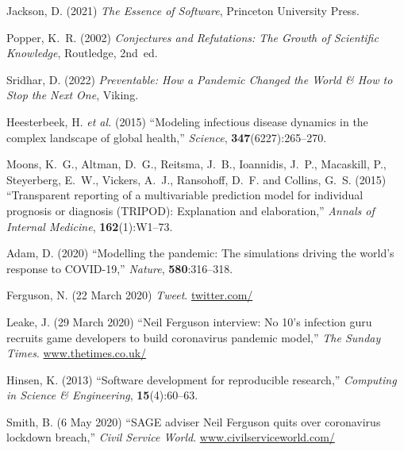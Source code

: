 \documentclass{comjnl}
\begin{document}
{\begin{thebibliography}{100}
{
Jackson, D. (2021) {\em The Essence of Software}, Princeton University Press.

Popper, K.~R. (2002) {\em Conjectures and Refutations: {The} Growth of
  Scientific Knowledge}, Routledge, 2nd~ed.

Sridhar, D. (2022) {\em Preventable: {How} a Pandemic Changed the World {\&}
  How to Stop the Next One}, Viking.

Heesterbeek, H. \emph{et al.} (2015) ``Modeling infectious disease dynamics in
  the complex landscape of global health,'' {\em Science},
  \textbf{347}(6227):265--270.
\newblock {}

Moons, K.~G., Altman, D.~G., Reitsma, J.~B., Ioannidis, J.~P., Macaskill, P.,
  Steyerberg, E.~W., Vickers, A.~J., Ransohoff, D.~F. and Collins, G.~S. (2015)
  ``Transparent reporting of a multivariable prediction model for individual
  prognosis or diagnosis ({TRIPOD}): {Explanation} and elaboration,'' {\em
  Annals of Internal Medicine}, \textbf{162}(1):W1--73.
\newblock {}

Adam, D. (2020) ``Modelling the pandemic: {The} simulations driving the world's
  response to {COVID}-19,'' {\em Nature}, \textbf{580}:316--318.
\newblock {}

Ferguson, N. (22 March 2020) {\em Tweet}.
\newblock
  \url{twitter.com/}

Leake, J. (29 March 2020) ``{Neil Ferguson} interview: {No} 10's infection guru
  recruits game developers to build coronavirus pandemic model,'' {\em The
  Sunday Times}.
\newblock
  \url{www.thetimes.co.uk/}

Hinsen, K. (2013) ``Software development for reproducible research,'' {\em
  Computing in Science {\&} Engineering}, \textbf{15}(4):60--63.
\newblock {}

Smith, B. (6 May 2020) ``{SAGE} adviser {Neil Ferguson }quits over coronavirus
  lockdown breach,'' {\em Civil Service World}.
\newblock
  \url{www.civilserviceworld.com/}\midurl{breach#:~:text=SAGE%

}}
\end{thebibliography}}
\end{document}
